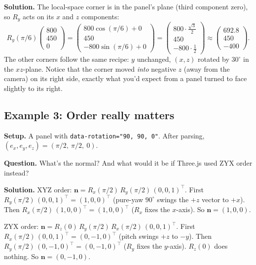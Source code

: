 \documentclass{article}
\begin{document}
\textbf{Solution.} The local-space corner is in the panel's plane (third
component zero), so $R_y$ acts on its $x$ and $z$ components:
\begin{equation*}
R_y(\pi/6)\begin{pmatrix}800\\ 450\\ 0\end{pmatrix} = \begin{pmatrix}800\cos(\pi/6) + 0\\ 450\\ -800\sin(\pi/6) + 0\end{pmatrix} = \begin{pmatrix}800\cdot\tfrac{\sqrt{3}}{2}\\ 450\\ -800\cdot\tfrac12\end{pmatrix} \approx \begin{pmatrix}692.8\\ 450\\ -400\end{pmatrix}.
\end{equation*}
The other corners follow the same recipe: $y$ unchanged, $(x, z)$ rotated by
$30^\circ$ in the $xz$-plane. Notice that the corner moved
\emph{into} negative $z$ (away from the camera) on its right side, exactly
what you'd expect from a panel turned to face slightly to its right.

\subsection*{Example 3: Order really matters}

\textbf{Setup.} A panel with \lstinline|data-rotation="90, 90, 0"|. After
parsing, $(e_x, e_y, e_z) = (\pi/2,\ \pi/2,\ 0)$.

\textbf{Question.} What's the normal? And what would it be if Three.js used
ZYX order instead?

\textbf{Solution.} XYZ order: $\mathbf{n} = R_x(\pi/2)\,R_y(\pi/2)\,(0,0,1)^\top$.
First $R_y(\pi/2)\,(0,0,1)^\top = (1, 0, 0)^\top$ (pure-yaw $90^\circ$ swings the
$+z$ vector to $+x$). Then $R_x(\pi/2)\,(1,0,0)^\top = (1,0,0)^\top$ ($R_x$
fixes the $x$-axis). So $\mathbf{n} = (1, 0, 0)$.

ZYX order: $\mathbf{n} = R_z(0)\,R_y(\pi/2)\,R_x(\pi/2)\,(0,0,1)^\top$.
First $R_x(\pi/2)\,(0,0,1)^\top = (0, -1, 0)^\top$ (pitch swings $+z$ to $-y$).
Then $R_y(\pi/2)\,(0,-1,0)^\top = (0, -1, 0)^\top$ ($R_y$ fixes the $y$-axis).
$R_z(0)$ does nothing. So $\mathbf{n} = (0, -1, 0)$.
\end{document}
